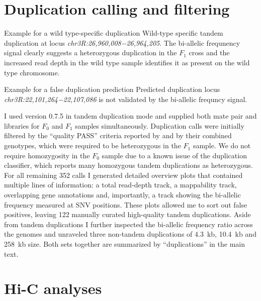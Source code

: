 \section{Duplication calling and filtering}
\label{sec:suppl_dup}

    {Example for a wild type-specific duplication}
    {Wild-type specific tandem duplication at locus
    \textit{chr3R:26,960,008−26,964,205}. The bi-allelic frequnency signal
    clearly suggests a heterozygous duplication in the $F_1$ cross and the
    increased read depth in the wild type sample identifies it as present on
    the wild type chromosome.}

    {Example for a false duplication prediction}
    {Predicted duplication locus \textit{chr3R:22,101,264−22,107,086} is not
    validated by the bi-allelic frequncy signal.}

I used \delly version 0.7.5 in tandem duplication mode and supplied both mate
pair and \wgs libraries for $F_0$ and $F_1$ samples simultaneously. Duplication
calls were initially filtered by the ``quality PASS'' criteria reported by
\delly and by their combined genotypes, which were required to be heterozygous
in the $F_1$ sample. We do not require homozygosity in the $F_0$ sample due to a
known issue of the duplication classifier, which reports many homozygous tandem
duplications as heterozygous. For all remaining 352 calls I generated detailed
overview plots that contained multiple lines of information: a total read-depth
track, a mappability track, overlapping gene annotations and, importantly, a
track showing the bi-allelic frequency measured at SNV positions. These plots
allowed me to sort out false positives, leaving 122 manually curated
high-quality tandem duplications. Aside from tandem duplications I further
inspected the bi-allelic frequency ratio across the genomes and unraveled three
non-tandem duplications of 4.3~kb, 10.4~kb and 258~kb size. Both sets together
are summarized by ``duplications'' in the main text.




\section{Hi-C analyses}
\label{sec:suppl_hic}
